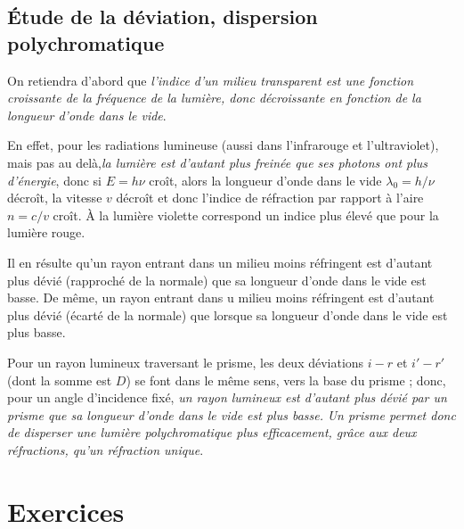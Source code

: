 \subsection{Étude de la déviation, dispersion polychromatique}

On retiendra d'abord que \emph{l'indice d'un milieu transparent est une fonction croissante de la fréquence de la lumière, donc décroissante en fonction de la longueur d'onde dans le vide}.

En effet, pour les radiations lumineuse (aussi dans l'infrarouge et l'ultraviolet), mais pas au delà,\emph{la lumière est d'autant plus freinée que ses photons ont plus d'énergie}, donc si \(E=h \nu\) croît, alors la longueur d'onde dans le vide \(\lambda_0 = h/\nu\) décroît, la vitesse \(v\) décroît et donc l'indice de réfraction par rapport à l'aire \(n=c/v\) croît. À la lumière violette correspond un indice plus élevé que pour la lumière rouge.

Il en résulte qu'un rayon entrant dans un milieu moins réfringent est d'autant plus dévié (rapproché de la normale) que sa longueur d'onde dans le vide est basse. De même, un rayon entrant dans u milieu moins réfringent est d'autant plus dévié (écarté de la normale) que lorsque sa longueur d'onde dans le vide est plus basse.

Pour un rayon lumineux traversant le prisme, les deux déviations \(i-r\) et \(i'-r'\) (dont la somme est \(D\)) se font dans le même sens, vers la base du prisme ; donc, pour un angle d'incidence fixé, \emph{un rayon lumineux est d'autant plus dévié par un prisme que sa longueur d'onde dans le vide est plus basse.}
\emph{Un prisme permet donc de disperser une lumière polychromatique plus efficacement, grâce aux deux réfractions, qu'un réfraction unique}.

\section{Exercices}


